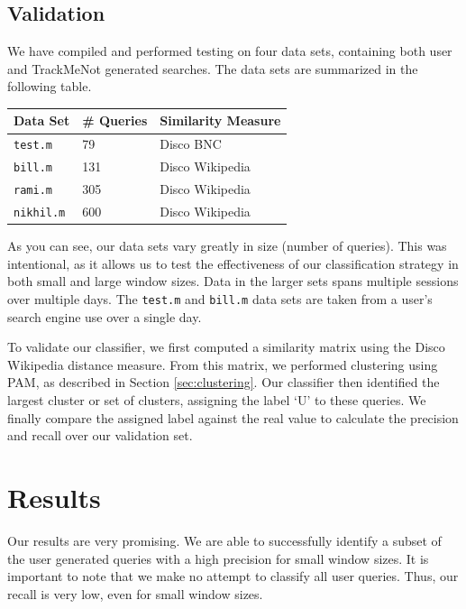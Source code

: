 \documentclass[11pt]{article}
\begin{document}
\begin{multicols}{2}
\subsection{Validation}
We have compiled and performed testing on four data sets, containing
both user and TrackMeNot generated searches. The data sets are
summarized in the following table.

\bigskip
\begin{centering}
    \begin{tabular}{ | l | l | l |}
    \hline
    {\bf Data Set} & {\bf \# Queries} & {\bf Similarity Measure} \\ \hline
    \texttt{test.m} & 79 & Disco BNC \\ \hline
    \texttt{bill.m} & 131 & Disco Wikipedia \\ \hline
    \texttt{rami.m} & 305 & Disco Wikipedia \\ \hline
    \texttt{nikhil.m} & 600 & Disco Wikipedia \\ \hline
    \end{tabular}
\end{centering}
\bigskip

As you can see, our data sets vary greatly in size (number of
queries). This was intentional, as it allows us to test the
effectiveness of our classification strategy in both small and large
window sizes. Data in the larger sets spans multiple sessions over
multiple days. The \texttt{test.m} and \texttt{bill.m} data sets are taken
from a user's search engine use over a single day.

To validate our classifier, we first computed a similarity matrix
using the Disco Wikipedia distance measure. From this matrix, we
performed clustering using PAM, as described in Section
\ref{sec:clustering}. Our classifier then identified the largest
cluster or set of clusters, assigning the label `U' to these
queries. We finally compare the assigned label against the real value
to calculate the precision and recall over our validation set.

\section{Results}
\label{sec:results}

Our results are very promising. We are able to successfully identify a
subset of the user generated queries with a high precision for small
window sizes. It is important to note that we make no attempt to
classify all user queries. Thus, our recall is very low, even for
small window sizes.


\end{multicols}
\end{document}
